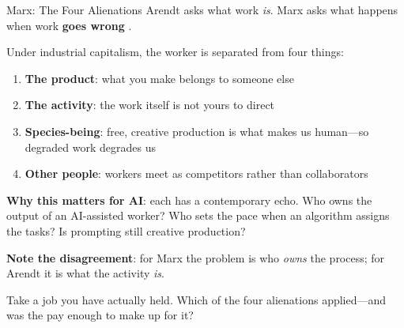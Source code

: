 ﻿\documentclass[aspectratio=169,11pt]{beamer}
\begin{document}
\begin{frame}[shrink=8]{Marx: The Four Alienations}
Arendt asks what work \emph{is}. Marx asks what happens when work \textbf{goes wrong} \parencite{marx_manuscripts}.

\vspace{0.2em}
\begin{conceptbox}
\small
Under industrial capitalism, the worker is separated from four things:
\begin{enumerate}
    \item \textbf{The product}: what you make belongs to someone else
    \item \textbf{The activity}: the work itself is not yours to direct
    \item \textbf{Species-being}: free, creative production is what makes us human---so degraded work degrades us
    \item \textbf{Other people}: workers meet as competitors rather than collaborators
\end{enumerate}
\end{conceptbox}

\vspace{0.2em}
{\small \textbf{Why this matters for AI}: each has a contemporary echo. Who owns the output of an AI-assisted worker? Who sets the pace when an algorithm assigns the tasks? Is prompting still creative production?

\vspace{0.15em}
\textbf{Note the disagreement}: for Marx the problem is who \emph{owns} the process; for Arendt it is what the activity \emph{is}.}

\begin{discussionbox}[Discussion]
Take a job you have actually held. Which of the four alienations applied---and was the pay enough to make up for it?
\end{discussionbox}
\end{frame}
\end{document}
